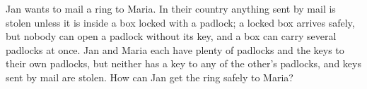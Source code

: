 Jan wants to mail a ring to Maria. In their country anything sent by mail is stolen unless it is inside a box locked with a padlock; a locked box arrives safely, but nobody can open a padlock without its key, and a box can carry several padlocks at once. Jan and Maria each have plenty of padlocks and the keys to their own padlocks, but neither has a key to any of the other's padlocks, and keys sent by mail are stolen. How can Jan get the ring safely to Maria?
